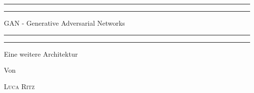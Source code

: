 \begin{titlepage} %

	\centering %

	\scshape %

	\vspace*{\baselineskip} %


	\rule{\textwidth}{1.6pt}\vspace*{-\baselineskip}\vspace*{2pt} %
	\rule{\textwidth}{0.4pt} %

	\vspace{0.75\baselineskip} %

	{\LARGE GAN - Generative Adversarial Networks\\} %

	\vspace{0.75\baselineskip} %

	\rule{\textwidth}{0.4pt}\vspace*{-\baselineskip}\vspace{3.2pt} %
	\rule{\textwidth}{1.6pt} %

	\vspace{2\baselineskip} %


	Eine weitere Architektur %

	\vspace*{3\baselineskip} %


	Von

	\vspace{0.5\baselineskip} %

	{\scshape\Large Luca Ritz} %

	\vspace{0.5\baselineskip} %


\end{titlepage}
